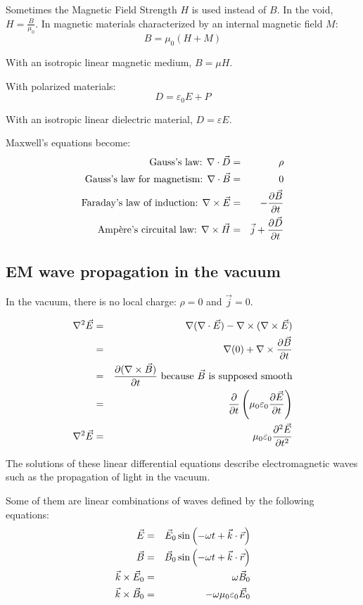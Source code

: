 \documentclass[a4paper,10pt]{article}
\newcommand{\vE}{\ensuremath\vec{E}} %
\newcommand{\vB}{\ensuremath\vec{B}} %
\newcommand{\pderiv}[2]{\ensuremath\frac{\partial #2}{\partial #1}}
\newcommand{\pdt}[1]{\ensuremath\pderiv{t}{#1}}
\newcommand{\pdtsq}[1]{\ensuremath\pderiv{t^2}{^2 #1}}
\begin{document}
Sometimes the Magnetic Field Strength $H$ is used instead of $B$.
In the void, $H = \frac{B}{\mu_0}$.
In magnetic materials characterized by an internal magnetic field $M$:
\begin{equation}
  B = \mu_0 (H + M)
\end{equation}

With an isotropic linear magnetic medium, $B = \mu H$.

With polarized materials:
\begin{equation}
  D = \varepsilon_0 E + P
\end{equation}

With an isotropic linear dielectric material, $D = \varepsilon E$.

Maxwell's equations become:
\begin{eqnarray}
  \text{Gauss's law: } \nabla \cdot \vec{D} &=& \rho \\
  \text{Gauss's law for magnetism: } \nabla \cdot \vB &=& 0 \\
  \text{Faraday's law of induction: } \nabla \times \vE &=& -\pdt{\vB} \\
  \text{Ampère's circuital law: } \nabla \times \vec{H} &=& \vec{j} + \pdt{\vec{D}}
\end{eqnarray}

\subsection{EM wave propagation in the vacuum}

In the vacuum, there is no local charge: $\rho = 0$ and $\vec{j} = 0$. 

\begin{eqnarray*}
  \nabla^2 \vE &=& \nabla(\nabla \cdot \vE) - \nabla \times (\nabla \times \vE) \\
               &=& \nabla(0) + \nabla \times \pdt{\vB} \\
               &=& \pdt{(\nabla \times \vB)} \text{ because $\vB$ is supposed smooth} \\
               &=& \pdt{}\left(\mu_0 \varepsilon_0 \pdt{\vE}\right) \\
  \nabla^2 \vE &=& \mu_0 \varepsilon_0 \pdtsq{\vE}
\end{eqnarray*}

The solutions of these linear differential equations describe electromagnetic waves such as the propagation of light in the vacuum.

Some of them are linear combinations of waves defined by the following equations:
\begin{eqnarray}
  \vE &=& \vE_0 \sin\left(-\omega t + \vec{k} \cdot \vec{r}\right) \\
  \vB &=& \vB_0 \sin\left(-\omega t + \vec{k} \cdot \vec{r}\right) \\
  \vec{k} \times \vE_0 &=& \omega \vB_0 \\
  \vec{k} \times \vB_0 &=& -\omega \mu_0 \varepsilon_0 \vE_0
\end{eqnarray}
\end{document}
